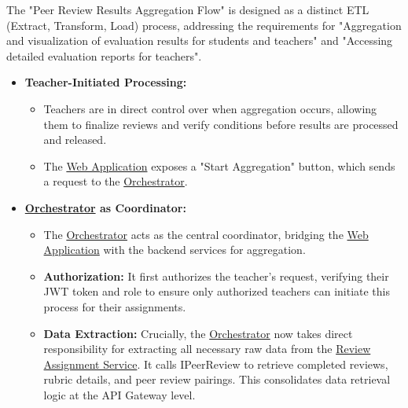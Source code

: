 \begin{justify}
    The "Peer Review Results Aggregation Flow" is designed as a distinct ETL (Extract, Transform, Load) process, addressing the requirements for "Aggregation and visualization of evaluation results for students and teachers" and "Accessing detailed evaluation reports for teachers". 
\end{justify}
\begin{itemize}
    \item \textbf{Teacher-Initiated Processing:}
    \begin{itemize}
        \item Teachers are in direct control over when aggregation occurs, allowing them to finalize reviews and verify conditions before results are processed and released.
        \item The \hyperref[def:WebApplication]{Web Application} exposes a "Start Aggregation" button, which sends a request to the \hyperref[def:Orchestrator]{Orchestrator}.
    \end{itemize}
    \item \textbf{\hyperref[def:Orchestrator]{Orchestrator} as Coordinator:}
    \begin{itemize}
        \item The \hyperref[def:Orchestrator]{Orchestrator} acts as the central coordinator, bridging the \hyperref[def:WebApplication]{Web Application} with the backend services for aggregation.
        
        \item \textbf{Authorization:} It first authorizes the teacher's request, verifying their JWT token and role to ensure only authorized teachers can initiate this process for their assignments.
        
        \item \textbf{Data Extraction:} Crucially, the \hyperref[def:Orchestrator]{Orchestrator} now takes direct responsibility for extracting all necessary raw data from the \hyperref[def:ReviewAssignmentService]{Review Assignment Service}. It calls IPeerReview to retrieve completed reviews, rubric details, and peer review pairings. This consolidates data retrieval logic at the API Gateway level.
        

\end{itemize}
\end{itemize}
